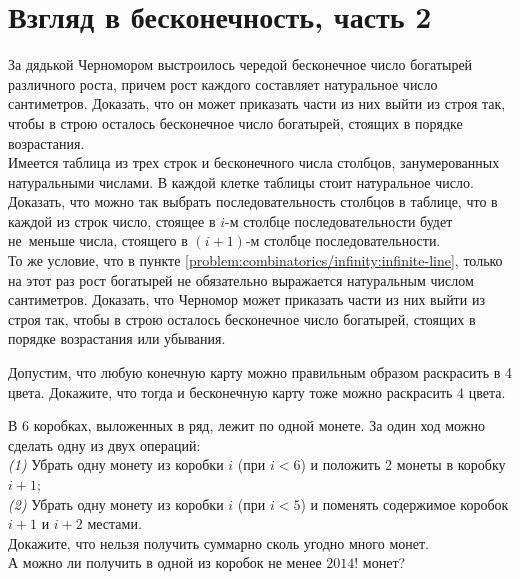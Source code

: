 

\section*{Взгляд в бесконечность, часть 2}


\begin{problems}

\item
\sbp\label{problem:combinatorics/infinity:infinite-line}%
За дядькой Черномором выстроилось чередой бесконечное число богатырей
различного роста, причем рост каждого составляет натуральное число сантиметров.
Доказать, что он может приказать части из них выйти из строя так, чтобы в
строю осталось бесконечное число богатырей, стоящих в порядке возрастания.
\\
\sbp
Имеется таблица из трех строк и бесконечного числа столбцов, занумерованных
натуральными числами.
В каждой клетке таблицы стоит натуральное число.
Доказать, что можно так выбрать последовательность столбцов в таблице, что в
каждой из строк число, стоящее в $i$-м столбце последовательности будет
не~меньше числа, стоящего в $(i+1)$-м столбце последовательности.
\\
\sbp
То же условие, что в пункте \ref{problem:combinatorics/infinity:infinite-line},
только на этот раз рост богатырей не обязательно выражается натуральным числом
сантиметров.
Доказать, что Черномор может приказать части из них выйти из строя так, чтобы в
строю осталось бесконечное число богатырей, стоящих в порядке возрастания или
убывания.

\item
Допустим, что любую конечную карту можно правильным образом раскрасить в 4
цвета.
Докажите, что тогда и бесконечную карту тоже можно раскрасить 4 цвета.

\item
В 6 коробках, выложенных в ряд, лежит по одной монете.
За один ход можно сделать одну из двух операций:
\\
\emph{(1)}
Убрать одну монету из коробки $i$ (при $i < 6$) и положить 2 монеты в коробку
$i + 1$;
\\
\emph{(2)}
Убрать одну монету из коробки $i$ (при $i < 5$) и поменять содержимое коробок
$i + 1$ и $i + 2$ местами.
\\
\sbp Докажите, что нельзя получить суммарно сколь угодно много монет.
\\
\sbp А можно ли получить в одной из коробок не менее $2014!$ монет?

\end{problems}

